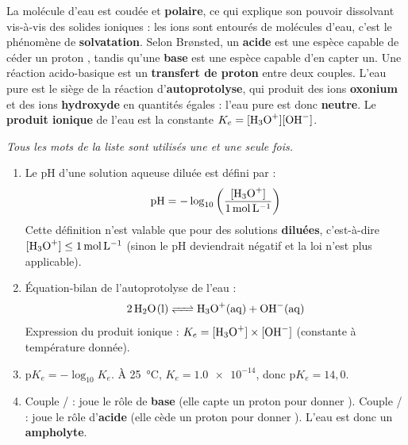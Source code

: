 \documentclass[11pt]{article}
\begin{document}
\begin{corrige}
La molécule d'eau est coudée et \textbf{polaire}, ce qui explique son pouvoir dissolvant vis-à-vis des solides ioniques : les ions sont entourés de molécules d'eau, c'est le phénomène de \textbf{solvatation}. Selon Brønsted, un \textbf{acide} est une espèce capable de céder un proton , tandis qu'une \textbf{base} est une espèce capable d'en capter un. Une réaction acido-basique est un \textbf{transfert de proton} entre deux couples. L'eau pure est le siège de la réaction d'\textbf{autoprotolyse}, qui produit des ions \textbf{oxonium}  et des ions \textbf{hydroxyde}  en quantités égales : l'eau pure est donc \textbf{neutre}. Le \textbf{produit ionique} de l'eau est la constante $K_e = [\ce{H3O+}][\ce{OH-}]$.

\medskip
\emph{Tous les mots de la liste sont utilisés une et une seule fois.}
\end{corrige}

\begin{corrige}
\begin{enumerate}
    \item Le pH d'une solution aqueuse diluée est défini par :
    \[ \text{pH} = -\log_{10}\left(\frac{[\ce{H3O+}]}{\SI{1}{mol.L^{-1}}}\right) \]
    Cette définition n'est valable que pour des solutions \textbf{diluées}, c'est-à-dire $[\ce{H3O+}] \leq \SI{1}{mol.L^{-1}}$ (sinon le pH deviendrait négatif et la loi n'est plus applicable).
    \item Équation-bilan de l'autoprotolyse de l'eau :
    \[ \ce{2 H2O(l) <=> H3O+(aq) + OH-(aq)} \]
    Expression du produit ionique : $K_e = [\ce{H3O+}] \times [\ce{OH-}]$ (constante à température donnée).
    \item $\text{p}K_e = -\log_{10} K_e$. À \SI{25}{\celsius}, $K_e = \num{1,0e-14}$, donc $\text{p}K_e = 14{,}0$.
    \item Couple / :  joue le rôle de \textbf{base} (elle capte un proton pour donner ). Couple / :  joue le rôle d'\textbf{acide} (elle cède un proton pour donner ). L'eau est donc un \textbf{ampholyte}.
\end{enumerate}
\end{corrige}
\end{document}
